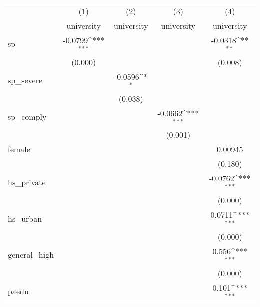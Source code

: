 {
\def\sym#1{\ifmmode^{#1}\else\(^{#1}\)\fi}
\begin{tabular}{l*{4}{c}}
\hline\hline
            &\multicolumn{1}{c}{(1)}&\multicolumn{1}{c}{(2)}&\multicolumn{1}{c}{(3)}&\multicolumn{1}{c}{(4)}\\
            &\multicolumn{1}{c}{university}&\multicolumn{1}{c}{university}&\multicolumn{1}{c}{university}&\multicolumn{1}{c}{university}\\
\hline
sp          &     -0.0799\sym{***}&                     &                     &     -0.0318\sym{**} \\
            &     (0.000)         &                     &                     &     (0.008)         \\
[1em]
sp\_severe   &                     &     -0.0596\sym{*}  &                     &                     \\
            &                     &     (0.038)         &                     &                     \\
[1em]
sp\_comply   &                     &                     &     -0.0662\sym{***}&                     \\
            &                     &                     &     (0.001)         &                     \\
[1em]
female      &                     &                     &                     &     0.00945         \\
            &                     &                     &                     &     (0.180)         \\
[1em]
hs\_private  &                     &                     &                     &     -0.0762\sym{***}\\
            &                     &                     &                     &     (0.000)         \\
[1em]
hs\_urban    &                     &                     &                     &      0.0711\sym{***}\\
            &                     &                     &                     &     (0.000)         \\
[1em]
general\_high&                     &                     &                     &       0.556\sym{***}\\
            &                     &                     &                     &     (0.000)         \\
[1em]
paedu       &                     &                     &                     &       0.101\sym{***}\\

\end{tabular}}
